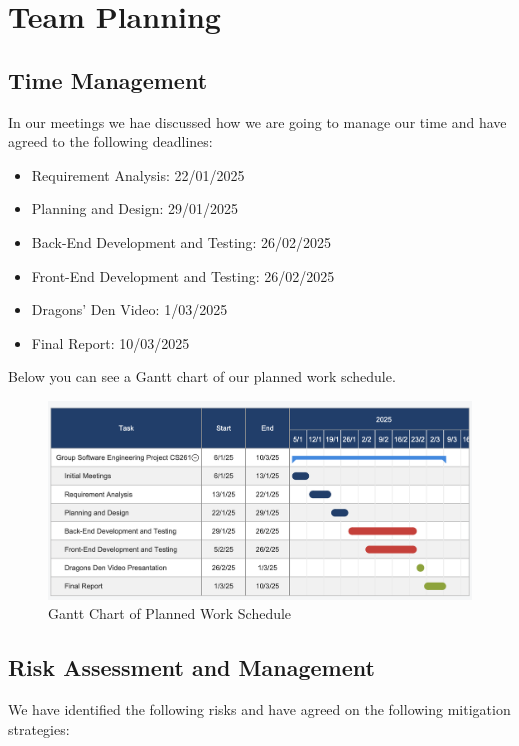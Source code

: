 \documentclass{article}
\begin{document}
\section{Team Planning}
\subsection{Time Management}
In our meetings we hae discussed how we are going to manage our time and have agreed to the following deadlines:

\begin{itemize}
    \item Requirement Analysis: 22/01/2025
    \item Planning and Design: 29/01/2025
    \item Back-End Development and Testing: 26/02/2025
    \item Front-End Development and Testing: 26/02/2025
    \item Dragons' Den Video: 1/03/2025
    \item Final Report: 10/03/2025
\end{itemize}

Below you can see a Gantt chart of our planned work schedule.

\begin{figure}[h!]
    \centering
    \includegraphics[width=\textwidth]{ganttchart.png}
    \caption{Gantt Chart of Planned Work Schedule}
    \label{fig:gantt_chart}
\end{figure}


\subsection{Risk Assessment and Management}
We have identified the following risks and have agreed on the following mitigation strategies:
\end{document}
